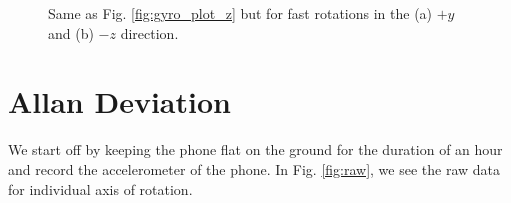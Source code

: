 \documentclass[a4paper]{article}
\begin{document}
\begin{figure}[hbt!]
	\centering
	\quad

	\caption{Same as Fig. \ref{fig:gyro_plot_z} but for fast rotations in the (a) $+y$ and (b) $-z$ direction.}
	\label{fig:gyro_plot_fast}
\end{figure}


\section{Allan Deviation}
We start off by keeping the phone flat on the ground for the duration of an hour and record the accelerometer of the phone. In Fig. \ref{fig:raw}, we see the raw data for individual axis of rotation. 
\end{document}
